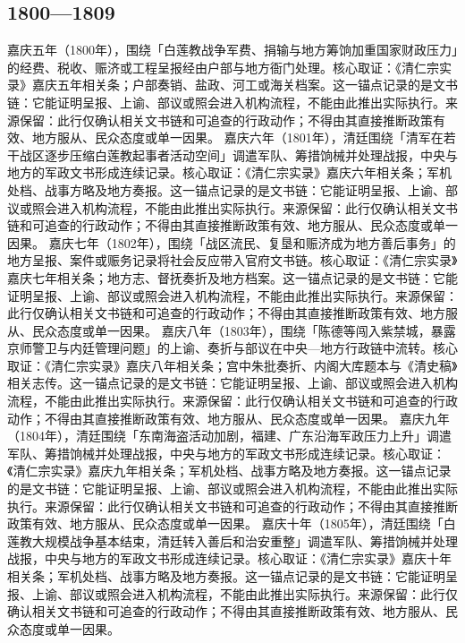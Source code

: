 \subsection{1800—1809}
嘉庆五年（1800年），围绕「白莲教战争军费、捐输与地方筹饷加重国家财政压力」的经费、税收、赈济或工程呈报经由户部与地方衙门处理。核心取证：《清仁宗实录》嘉庆五年相关条；户部奏销、盐政、河工或海关档案。这一锚点记录的是文书链：它能证明呈报、上谕、部议或照会进入机构流程，不能由此推出实际执行。来源保留：此行仅确认相关文书链和可追查的行政动作；不得由其直接推断政策有效、地方服从、民众态度或单一因果。
嘉庆六年（1801年），清廷围绕「清军在若干战区逐步压缩白莲教起事者活动空间」调遣军队、筹措饷械并处理战报，中央与地方的军政文书形成连续记录。核心取证：《清仁宗实录》嘉庆六年相关条；军机处档、战事方略及地方奏报。这一锚点记录的是文书链：它能证明呈报、上谕、部议或照会进入机构流程，不能由此推出实际执行。来源保留：此行仅确认相关文书链和可追查的行政动作；不得由其直接推断政策有效、地方服从、民众态度或单一因果。
嘉庆七年（1802年），围绕「战区流民、复垦和赈济成为地方善后事务」的地方呈报、案件或赈务记录将社会反应带入官府文书链。核心取证：《清仁宗实录》嘉庆七年相关条；地方志、督抚奏折及地方档案。这一锚点记录的是文书链：它能证明呈报、上谕、部议或照会进入机构流程，不能由此推出实际执行。来源保留：此行仅确认相关文书链和可追查的行政动作；不得由其直接推断政策有效、地方服从、民众态度或单一因果。
嘉庆八年（1803年），围绕「陈德等闯入紫禁城，暴露京师警卫与内廷管理问题」的上谕、奏折与部议在中央—地方行政链中流转。核心取证：《清仁宗实录》嘉庆八年相关条；宫中朱批奏折、内阁大库题本与《清史稿》相关志传。这一锚点记录的是文书链：它能证明呈报、上谕、部议或照会进入机构流程，不能由此推出实际执行。来源保留：此行仅确认相关文书链和可追查的行政动作；不得由其直接推断政策有效、地方服从、民众态度或单一因果。
嘉庆九年（1804年），清廷围绕「东南海盗活动加剧，福建、广东沿海军政压力上升」调遣军队、筹措饷械并处理战报，中央与地方的军政文书形成连续记录。核心取证：《清仁宗实录》嘉庆九年相关条；军机处档、战事方略及地方奏报。这一锚点记录的是文书链：它能证明呈报、上谕、部议或照会进入机构流程，不能由此推出实际执行。来源保留：此行仅确认相关文书链和可追查的行政动作；不得由其直接推断政策有效、地方服从、民众态度或单一因果。
嘉庆十年（1805年），清廷围绕「白莲教大规模战争基本结束，清廷转入善后和治安重整」调遣军队、筹措饷械并处理战报，中央与地方的军政文书形成连续记录。核心取证：《清仁宗实录》嘉庆十年相关条；军机处档、战事方略及地方奏报。这一锚点记录的是文书链：它能证明呈报、上谕、部议或照会进入机构流程，不能由此推出实际执行。来源保留：此行仅确认相关文书链和可追查的行政动作；不得由其直接推断政策有效、地方服从、民众态度或单一因果。
